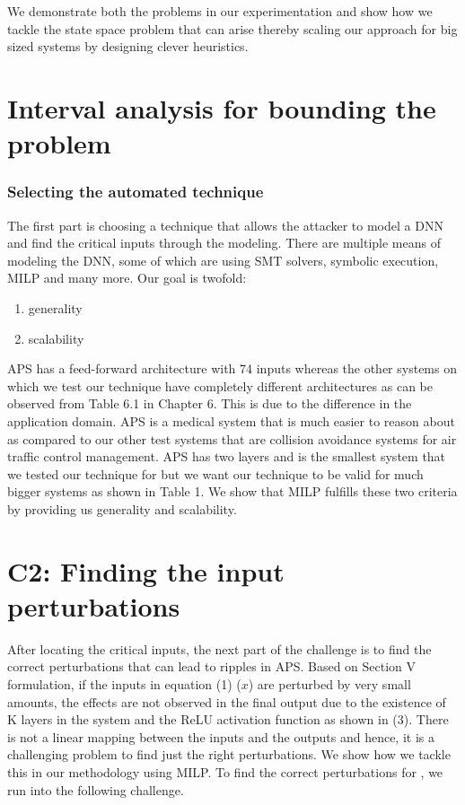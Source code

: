 We demonstrate both the problems in our experimentation and show how we tackle the state space problem that can arise thereby scaling our approach for big sized systems by designing clever heuristics. 


\section{Interval analysis for bounding the problem}










\subsubsection*{Selecting  the automated technique}
The first part is choosing a technique that allows the attacker to model a DNN and find the critical inputs through the modeling. There are multiple means of modeling the DNN, some of which are using SMT solvers, symbolic execution, MILP and many more. 
Our goal is twofold: 
\begin{enumerate}
	\item generality
	\item scalability
\end{enumerate}

APS has a  feed-forward architecture with 74 inputs whereas the other systems on which we test our technique have completely different architectures as can be observed from Table 6.1 in Chapter 6. This is due to the difference in the application domain. APS is a medical system that is much easier to reason about as compared to our other test systems that are collision avoidance systems for air traffic control management.
APS has two layers and is the smallest system that we tested our technique for but we want our technique to be valid for much bigger systems as shown in Table 1. We show that MILP fulfills these two criteria by providing us generality and scalability. 


\section*{\textbf{C2}: Finding the input perturbations}
After locating the critical inputs, the next part of the challenge is to find the correct perturbations that can lead to ripples in APS. Based on Section V formulation, if the inputs in equation (1) ($x$) are perturbed by very small amounts, the effects are not observed in the final output due to the existence of K layers in the system and the ReLU activation function as shown in (3). There is not a linear mapping between the inputs and the outputs and hence, it is a challenging problem to find just the right perturbations. We show how we tackle this in our methodology using MILP. To find the correct perturbations for \attack, we run into the following challenge. 

